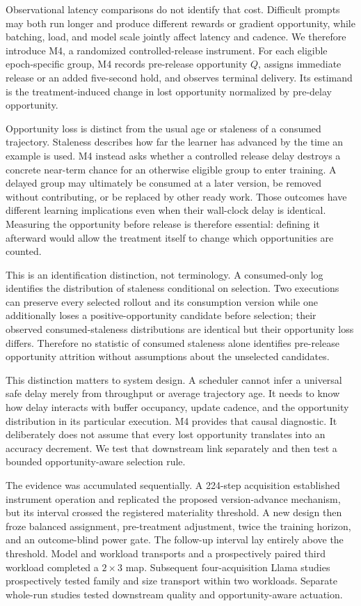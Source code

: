 \documentclass{article}
\begin{document}
Observational latency comparisons do not identify that cost. Difficult prompts may both run longer and produce different rewards or gradient opportunity, while batching, load, and model scale jointly affect latency and cadence. We therefore introduce M4, a randomized controlled-release instrument. For each eligible epoch-specific group, M4 records pre-release opportunity $Q$, assigns immediate release or an added five-second hold, and observes terminal delivery. Its estimand is the treatment-induced change in lost opportunity normalized by pre-delay opportunity.

Opportunity loss is distinct from the usual age or staleness of a consumed trajectory. Staleness describes how far the learner has advanced by the time an example is used. M4 instead asks whether a controlled release delay destroys a concrete near-term chance for an otherwise eligible group to enter training. A delayed group may ultimately be consumed at a later version, be removed without contributing, or be replaced by other ready work. Those outcomes have different learning implications even when their wall-clock delay is identical. Measuring the opportunity before release is therefore essential: defining it afterward would allow the treatment itself to change which opportunities are counted.

This is an identification distinction, not terminology. A consumed-only log identifies the distribution of staleness conditional on selection. Two executions can preserve every selected rollout and its consumption version while one additionally loses a positive-opportunity candidate before selection; their observed consumed-staleness distributions are identical but their opportunity loss differs. Therefore no statistic of consumed staleness alone identifies pre-release opportunity attrition without assumptions about the unselected candidates.

This distinction matters to system design. A scheduler cannot infer a universal safe delay merely from throughput or average trajectory age. It needs to know how delay interacts with buffer occupancy, update cadence, and the opportunity distribution in its particular execution. M4 provides that causal diagnostic. It deliberately does not assume that every lost opportunity translates into an accuracy decrement. We test that downstream link separately and then test a bounded opportunity-aware selection rule.

The evidence was accumulated sequentially. A 224-step acquisition established instrument operation and replicated the proposed version-advance mechanism, but its interval crossed the registered materiality threshold. A new design then froze balanced assignment, pre-treatment adjustment, twice the training horizon, and an outcome-blind power gate. The follow-up interval lay entirely above the threshold. Model and workload transports and a prospectively paired third workload completed a $2\times3$ map. Subsequent four-acquisition Llama studies prospectively tested family and size transport within two workloads. Separate whole-run studies tested downstream quality and opportunity-aware actuation.
\end{document}
